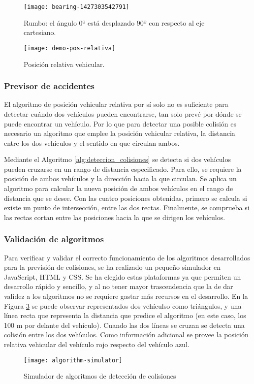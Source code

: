 \begin{figure}[h]
	\begin{center}
		\texttt{[image: bearing-1427303542791]}
		\caption{Rumbo: el ángulo 0º está desplazado 90º con respecto al eje cartesiano.}
		\label{fig:rumbo_gps}
	\end{center}
\end{figure}
\begin{figure}[h]
	\begin{center}
		\texttt{[image: demo-pos-relativa]}
		\caption{Posición relativa vehicular.}
		\label{fig:demo_pos_relativa}
	\end{center}
\end{figure}

\FloatBarrier
\subsubsection{Previsor de accidentes}
El algoritmo de posición vehicular relativa por sí solo no es suficiente para
detectar cuándo dos vehículos pueden encontrarse, tan solo prevé por dónde se
puede encontrar un vehículo. Por lo que para detectar una posible colisión es
necesario un algoritmo que emplee la posición vehicular relativa, la distancia
entre los dos vehículos y el sentido en que circulan ambos.

Mediante el Algoritmo \ref{alg:deteccion_colisiones} se detecta si dos
vehículos pueden cruzarse en un rango de distancia especificado. Para ello,
se requiere la posición de ambos vehículos y la dirección hacia la que
circulan. Se aplica un algoritmo para calcular la nueva posición de ambos
vehículos en el rango de distancia que se desee. Con las cuatro posiciones
obtenidas, primero se calcula si existe un punto de intersección, entre las
dos rectas. Finalmente, se comprueba si las rectas cortan entre las posiciones
hacia la que se dirigen los vehículos.

\subsubsection{Validación de algoritmos}
Para verificar y validar el correcto funcionamiento de los algoritmos
desarrollados para la previsión de colisiones, se ha realizado un pequeño
simulador en JavaScript, HTML y CSS. Se ha elegido estas plataformas ya que
permiten un desarrollo rápido y sencillo, y al no tener mayor trascendencia que
la de dar validez a los algoritmos no se requiere gastar más recursos en el
desarrollo. En la Figura \ref{fig:simulador-algoritmos} se puede observar
representados dos vehículso como triángulos, y una línea recta que representa
la distancia que predice el algoritmo (en este caso, los 100 m por delante
del vehículo). Cuando las dos líneas se cruzan se detecta una colisión entre
los dos vehículos. Como información adicional se provee la posición relativa
vehicular del vehículo rojo respecto del vehículo azul.

\begin{figure}[h]
	\begin{center}
		\texttt{[image: algorithm-simulator]}
		\caption{Simulador de algoritmos de detección de colisiones}
		\label{fig:simulador-algoritmos}
	\end{center}
\end{figure}
